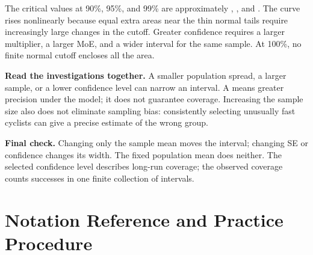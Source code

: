 The critical values at 90\%, 95\%, and 99\% are approximately
, , and .
The curve rises nonlinearly because equal extra areas near the thin normal tails
require increasingly large changes in the cutoff. Greater confidence requires
a larger multiplier, a larger MoE, and a wider interval for the same sample.
At 100\%, no finite normal cutoff encloses all the area.

\textbf{Read the investigations together.} A smaller population spread, a larger
sample, or a lower confidence level can narrow an interval. A  means greater precision under the model; it does not guarantee coverage.
Increasing the sample size also does not eliminate sampling bias: consistently
selecting unusually fast cyclists can give a precise estimate of the wrong group.

\textbf{Final check.} Changing only the sample mean moves the interval; changing
SE or confidence changes its width. The fixed population mean does neither.
The selected confidence level describes long-run coverage; the observed coverage
counts successes in one finite collection of intervals.
\par\vspace{3mm}

\clearpage
\section{Notation Reference and Practice Procedure}
\label{sec:notation-and-procedure}
\label{tab:notation-reference}


